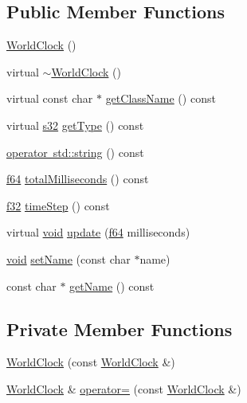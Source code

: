 \subsection*{Public Member Functions}
\begin{DoxyCompactItemize}
\item 
\mbox{\hyperlink{classnjli_1_1_world_clock_abc95e23fc5d9c28884e4775c2c61e232}{World\+Clock}} ()
\item 
virtual \mbox{\hyperlink{classnjli_1_1_world_clock_aac4a9a1501e69c88ef720b01564c9d4c}{$\sim$\+World\+Clock}} ()
\item 
virtual const char $\ast$ \mbox{\hyperlink{classnjli_1_1_world_clock_a3d049ae0564d07c40cc0f9a3d5ccf20e}{get\+Class\+Name}} () const
\item 
virtual \mbox{\hyperlink{_util_8h_aa62c75d314a0d1f37f79c4b73b2292e2}{s32}} \mbox{\hyperlink{classnjli_1_1_world_clock_ada98188afadfa5dc712d96a0d12f56a2}{get\+Type}} () const
\item 
\mbox{\hyperlink{classnjli_1_1_world_clock_a0ebeaf0636f48e20734bf05dee514ff3}{operator std\+::string}} () const
\item 
\mbox{\hyperlink{_util_8h_a94dab5770726ccbef8c7d026cfbdf8e5}{f64}} \mbox{\hyperlink{classnjli_1_1_world_clock_a0594a3ed72d610082cc4ad00bb2d0e42}{total\+Milliseconds}} () const
\item 
\mbox{\hyperlink{_util_8h_a5f6906312a689f27d70e9d086649d3fd}{f32}} \mbox{\hyperlink{classnjli_1_1_world_clock_a756caa9141b7e68da86d65050552102d}{time\+Step}} () const
\item 
virtual \mbox{\hyperlink{_thread_8h_af1e856da2e658414cb2456cb6f7ebc66}{void}} \mbox{\hyperlink{classnjli_1_1_world_clock_ae68c432422e175aaa52746b99c57f843}{update}} (\mbox{\hyperlink{_util_8h_a94dab5770726ccbef8c7d026cfbdf8e5}{f64}} milliseconds)
\item 
\mbox{\hyperlink{_thread_8h_af1e856da2e658414cb2456cb6f7ebc66}{void}} \mbox{\hyperlink{classnjli_1_1_world_clock_a087eb5f8d9f51cc476f12f1d10a3cb95}{set\+Name}} (const char $\ast$name)
\item 
const char $\ast$ \mbox{\hyperlink{classnjli_1_1_world_clock_ad41266885be835f3ee602311e20877a4}{get\+Name}} () const
\end{DoxyCompactItemize}
\subsection*{Private Member Functions}
\begin{DoxyCompactItemize}
\item 
\mbox{\hyperlink{classnjli_1_1_world_clock_a7980edaac13345c4a1589542a699d53e}{World\+Clock}} (const \mbox{\hyperlink{classnjli_1_1_world_clock}{World\+Clock}} \&)
\item 
\mbox{\hyperlink{classnjli_1_1_world_clock}{World\+Clock}} \& \mbox{\hyperlink{classnjli_1_1_world_clock_a4e158b42fd4835209dce260ffe490420}{operator=}} (const \mbox{\hyperlink{classnjli_1_1_world_clock}{World\+Clock}} \&)
\end{DoxyCompactItemize}
